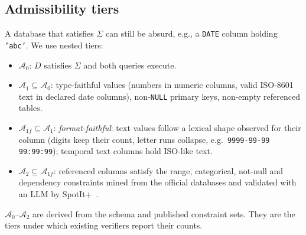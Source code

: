 \subsection{Admissibility tiers}
A database that satisfies $\Sigma$ can still be absurd, e.g., a \texttt{DATE} column holding \texttt{'abc'}. We use nested tiers:
\begin{itemize}
\item $\mathcal A_0$: $D$ satisfies $\Sigma$ and both queries execute.
\item $\mathcal A_1\subseteq\mathcal A_0$: type-faithful values (numbers in numeric columns, valid ISO-8601 text in declared date columns), non-\texttt{NULL} primary keys, non-empty referenced tables.
\item $\mathcal A_{1f}\subseteq\mathcal A_1$: \emph{format-faithful}: text values follow a lexical shape observed for their column (digits keep their count, letter runs collapse, e.g.\ \texttt{9999-99-99 99:99:99}); temporal text columns hold ISO-like text.
\item $\mathcal A_2\subseteq\mathcal A_{1f}$: referenced columns satisfy the range, categorical, not-null and dependency constraints mined from the official databases and validated with an LLM by SpotIt+~\cite{tremante2026spotitplus}.
\end{itemize}
$\mathcal A_0$--$\mathcal A_2$ are derived from the schema and published constraint sets. They are the tiers under which existing verifiers report their counts.

